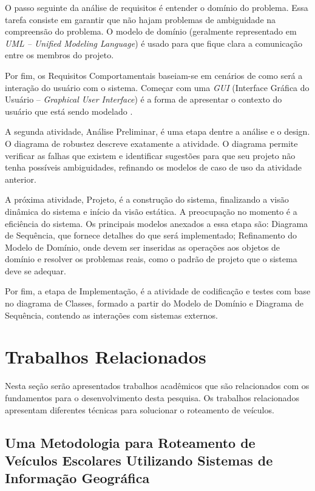 O passo seguinte da análise de requisitos é entender o domínio do problema. Essa tarefa consiste em garantir que não hajam problemas de ambiguidade na compreensão do problema. O modelo de domínio (geralmente representado em \emph{UML -- Unified Modeling Language}) é usado para que fique clara a comunicação entre os membros do projeto.

Por fim, os Requisitos Comportamentais baseiam-se em cenários de como será a interação do usuário com o sistema. Começar com uma \emph{GUI} (Interface Gráfica do Usuário -- \emph{Graphical User Interface}) é a forma de apresentar o contexto do usuário que está sendo modelado \cite{iconixuml}.

A segunda atividade, Análise Preliminar, é uma etapa dentre a análise e o design. O diagrama de robustez descreve exatamente a atividade. O diagrama permite verificar as falhas que existem e identificar sugestões para que seu projeto não tenha possíveis ambiguidades, refinando os modelos de caso de uso da atividade anterior.

A próxima atividade, Projeto, é a construção do sistema, finalizando a visão dinâmica do sistema e início da visão estática. A preocupação no momento é a eficiência do sistema. Os principais modelos anexados a essa etapa são: Diagrama de Sequência, que fornece detalhes do que será implementado; Refinamento do Modelo de Domínio, onde devem ser inseridas as operações aos objetos de domínio e resolver os problemas reais, como o padrão de projeto que o sistema deve se adequar.

Por fim, a etapa de Implementação, é a atividade de codificação e testes com base no diagrama de Classes, formado a partir do Modelo de Domínio e Diagrama de Sequência, contendo as interações com sistemas externos.



\section{Trabalhos Relacionados}
\label{relacionados}
Nesta seção serão apresentados trabalhos acadêmicos que são relacionados com os fundamentos para o desenvolvimento desta pesquisa. Os trabalhos relacionados apresentam diferentes técnicas para solucionar o roteamento de veículos.

\subsection{Uma Metodologia para Roteamento de Veículos Escolares Utilizando Sistemas de Informação Geográfica \cite{maxwell}} 

